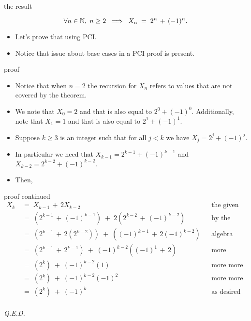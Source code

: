 \documentclass[handout,landscape]{beamer}
\begin{document}
\begin{frame}{the result}
\begin{thm*}
\[ \forall n \in {\mathbb N}, \; n \geq 2 \; \implies \; X_n  \; = \; 2^n \, + \, (-1)^n. \]
\end{thm*}
\pause
\begin{itemize}
\item Let's prove that using PCI. \pause
\item Notice that issue about base cases in a PCI proof is present.
\end{itemize}
\end{frame}

\begin{frame}{proof}
\begin{itemize}
\item Notice that when $n=2$ the recursion for $X_n$ refers to values that are not covered by the theorem. \pause
\item We note that $X_0 = 2$ and that is also equal to $2^0+(-1)^0$.  Additionally, note that $X_1 = 1$ and that is also equal to $2^1 + (-1)^1$. \pause
\item Suppose $k \geq 3$ is an integer such that for all $j<k$ we have $X_j = 2^j+(-1)^j$. \pause
\item In particular we need that $X_{k-1} = 2^{k-1}+(-1)^{k-1}$ and $X_{k-2} = 2^{k-2}+(-1)^{k-2}$. \pause
\item Then, 
\end{itemize}
\end{frame}

\begin{frame}{proof continued}
\begin{align*}
X_k \; &= \; X_{k-1} \, + \, 2 X_{k-2} & & \mbox{the given recurrence} \\
       &= \; (2^{k-1}\,+\,(-1)^{k-1}) \; + \; 2(2^{k-2}\,+\,(-1)^{k-2}) & & \mbox{by the inductive hypothesis}\\
       &= \; (2^{k-1}\,+\,2(2^{k-2})) \; + \; ((-1)^{k-1}\,+\,2(-1)^{k-2}) & & \mbox{algebra}\\
       &= \; (2^{k-1}\,+\,2^{k-1}) \; + \; (-1)^{k-2}((-1)^1\,+\,2) & & \mbox{more algebra}\\
       &= \; (2^{k}) \; + \; (-1)^{k-2}(1) & & \mbox{more more algebra}\\
       &= \; (2^{k}) \; + \; (-1)^{k-2}(-1)^2 & & \mbox{more more more algebra}\\
       &= \; (2^{k}) \; + \; (-1)^{k} & & \mbox{as desired}\\
\end{align*}

\hfill {\em Q.E.D.}

\end{frame}
\end{document}
